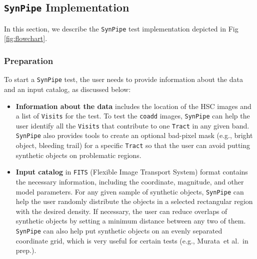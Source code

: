\documentclass[useamsfonts]{pasj01}
\def\etal{{\ et al.~}}
\def\synpipe{\texttt{SynPipe}}
\def\coadd{\texttt{coadd}}
\def\tract{\texttt{Tract}}
\def\visits{\texttt{Visits}}
\begin{document}
\subsection{\synpipe{} Implementation }
    \label{ssec:flowchart}

    In this section, we describe the \synpipe{} test implementation depicted in 
    Fig \ref{fig:flowchart}.

\subsubsection{Preparation}
    \label{sssec:prep}

    To start a \synpipe{} test, the user needs to provide information about the data 
    and an input catalog, as discussed below:

    \begin{itemize}

        \item \textbf{Information about the data}
            includes the location of the HSC images and a list of \visits{} for 
            the test.
            To test the \coadd{} images, \synpipe{} can help the user identify
            all the \visits{} that contribute to one \tract{} in any given
            band.
            \synpipe{} also provides tools to create an optional bad-pixel mask 
            (e.g., bright object, bleeding trail) for a specific \tract{} so that 
            the user can avoid putting synthetic objects on problematic regions.

        \item \textbf{Input catalog} in \texttt{FITS} (Flexible Image Transport System)
            format contains the necessary information, including the coordinate, 
            magnitude, and other model parameters.  
            For any given sample of synthetic objects, \synpipe{} can help the user 
            randomly distribute the objects in a selected rectangular region with the
            desired density.
            If necessary, the user can reduce overlaps of synthetic objects by setting 
            a minimum distance between any two of them. 
            \synpipe{} can also help put synthetic objects on an evenly separated
            coordinate grid, which is very useful for certain tests
            (e.g., Murata\etal in prep.).

    \end{itemize}
\end{document}

